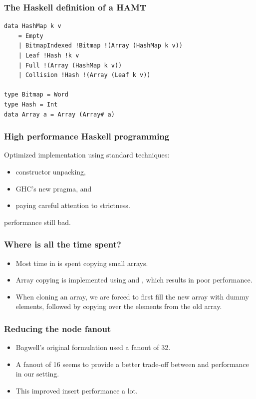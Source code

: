 \documentclass[xetex,mathserif,serif]{beamer}
\newcommand{\code}[1]{\mbox{\texttt{\small{\color{CodeColor}{#1}}}}}
\begin{document}
\begin{frame}[fragile]
  \frametitle{The Haskell definition of a HAMT}
  \begin{lstlisting}
data HashMap k v
    = Empty
    | BitmapIndexed !Bitmap !(Array (HashMap k v))
    | Leaf !Hash !k v
    | Full !(Array (HashMap k v))
    | Collision !Hash !(Array (Leaf k v))

type Bitmap = Word
type Hash = Int
data Array a = Array (Array# a)
  \end{lstlisting}
\end{frame}

\begin{frame}
  \frametitle{High performance Haskell programming}
  Optimized implementation using standard techniques:
  \begin{itemize}
  \item constructor unpacking,
  \item GHC's new \code{INLINABLE} pragma, and
  \item paying careful attention to strictness.
  \end{itemize}
  \code{insert} performance still bad.
\end{frame}

\begin{frame}
  \frametitle{Where is all the time spent?}

  \begin{itemize}
  \item Most time in \code{insert} is spent copying small arrays.
  \item Array copying is implemented using \code{indexArray\#}
    and \code{writeArray\#}, which results in poor performance.
  \item When cloning an array, we are forced to first fill the new
    array with dummy elements, followed by copying over the elements
    from the old array.
  \end{itemize}
\end{frame}

\begin{frame}
  \frametitle{Reducing the node fanout}

  \begin{itemize}
  \item Bagwell's original formulation used a fanout of 32.
  \item A fanout of 16 seems to provide a better trade-off between
    \code{lookup} and \code{insert} performance in our setting.
  \item This improved insert performance a lot.
  \end{itemize}
\end{frame}
\end{document}

